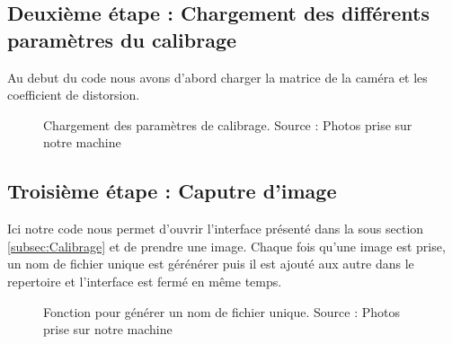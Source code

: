 \subsection{Deuxième étape : Chargement des différents paramètres du calibrage }
 
 Au debut du code nous avons d'abord charger la matrice de la caméra et les coefficient de distorsion.  
 
 \begin{figure}[H]%
 	\center%
 	\setlength{\fboxsep}{5pt}%
 	\setlength{\fboxrule}{0.5pt}%
 	\caption[Chargement des paramètres de calibrage]{Chargement des paramètres de calibrage. Source : Photos prise sur notre machine}
 	\label{fig:Chargement des paramètres de calibrage}
 \end{figure}
 
 
 \subsection{Troisième étape : Caputre d'image}
 
 Ici notre code nous permet d'ouvrir l'interface présenté dans la sous section \ref{subsec:Calibrage} et de prendre une image. Chaque fois qu'une image est prise, un nom de fichier unique est gérénérer puis il est ajouté aux autre dans le repertoire et l'interface est fermé en même temps.
 
 \begin{figure}[H]%
 	\center%
 	\setlength{\fboxsep}{5pt}%
 	\setlength{\fboxrule}{0.5pt}%
 	\caption[Fonction pour générer un nom de fichier unique]{Fonction pour générer un nom de fichier unique. Source : Photos prise sur notre machine}
 	\label{fig:Fonction pour générer un nom de fichier unique}
 \end{figure}
 
